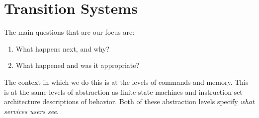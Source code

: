 
\chapter{Transition Systems}
\label{chap:transitionSystems}

The main questions that are our focus are:
\begin{enumerate}
\item What happens next, and why?
\item What happened and was it appropriate?
\end{enumerate}

The context in which we do this is at the levels of commands and
memory. This is at the same levels of abstraction as finite-state
machines and instruction-set architecture descriptions of behavior.
Both of these abstraction levels specify \emph{what services users
  see}.
